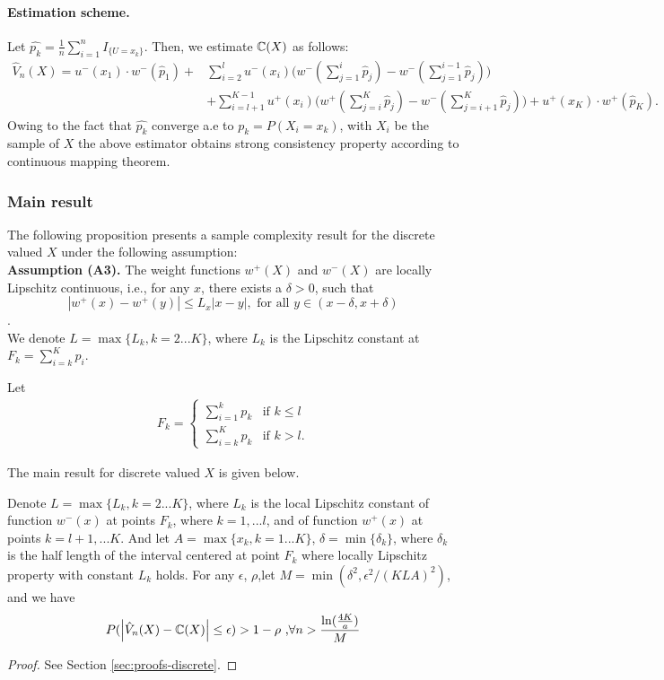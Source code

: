 \paragraph{Estimation scheme.} 
Let $\hat{p_k}= \frac{1}{n} \sum_{i=1}^n I_{\{U =x_k\}}$. Then, we estimate $\mathbb{C}(X)$ as follows:
\begin{align}
 \label{eq:cpt-discrete-est}
\hat V_n(X) = 
u^-(x_1)\cdot w^-(\hat p_1)+
& \sum_{i=2}^l u^-(x_i) \Big(w^-(\sum_{j=1}^i \hat p_j) - w^-(\sum_{j=1}^{i-1} \hat p_j)\Big) 
\\
&
+ \sum_{i=l+1}^{K-1} u^+(x_i) \Big(w^+(\sum_{j=i}^K \hat p_j) - w^-(\sum_{j=i+1}^K \hat p_j) \Big)+ u^+(x_K)\cdot w^+(\hat p_K).
\end{align}
Owing to the fact that $\hat{p_k}$ converge a.e to $p_k=P(X_i=x_k)$, with $X_i$ be the sample of $X$ the above estimator obtains strong consistency property according to continuous mapping theorem. 


\subsubsection*{Main result}
The following proposition presents a sample complexity result for the discrete valued $X$ under the following assumption:\\
\textbf{Assumption (A3).}  The weight functions $w^+(X)$ and $w^-(X)$ are locally Lipschitz continuous, i.e., for any $x$, there exists a $\delta>0$, such that
$$| w^+(x) - w^+(y) | \leq L_x |x-y|, \text{ for all } y \in (x-\delta,x+\delta) $$.\\

We denote $L=\max\{L_k, k=2...K\}$,  where $L_k$ is the Lipschitz constant at $F_k = \sum_{i=k}^K p_i$.


Let 
\begin{align}
\label{eq:Fk}
F_k = 
\begin{cases}
   \sum_{i=1}^k p_k & \text{if   } k \leq l \\
   \sum_{i=k}^K p_k & \text{if  }  k > l.
\end{cases}  
\end{align}

The main result for discrete valued $X$ is given below.
\begin{proposition}
\label{prop:sample-complexity-discrete}
Denote $L=\max\{L_k, k=2...K\} $, where $L_k$ is the local Lipschitz constant of function $w^-(x)$ at points
$F_k$, where $k=1,...l$, and of function $w^+(x)$ at points $k=l+1,...K$. 
And let $A=\max\{x_k, k=1...K\}$, $\delta =\min\{\delta_k\}$, where $\delta_k$ is the half length of the interval centered at point $F_k$ where locally Lipschitz property with constant $L_k$ holds.
For any $\epsilon$, $\rho$,let $M=\min(\delta^2, \epsilon^2/(KLA)^2)$, and we have 
\begin{align}
P(\left|
\hat V_n(X) -\mathbb{C}(X)
\right| \leq \epsilon) > 1-\rho \text{        ,} \forall n> \frac{\ln(\frac{4K}{a})} { M} 
\end{align}
\end{proposition}
\begin{proof}
 See Section \ref{sec:proofs-discrete}.
\end{proof}

